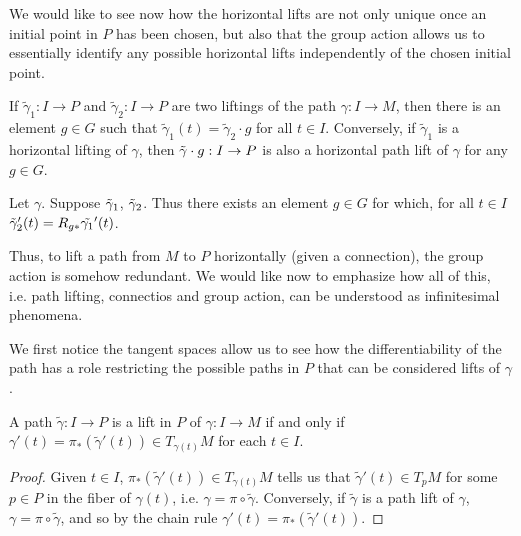 We would like to see now how the horizontal lifts are not only unique once an initial point in $P$ has been chosen, but also that the group action allows us to essentially identify any possible horizontal lifts independently of the chosen initial point.

\begin{theorem}\label{thm:pathRed}
If $\tilde{\gamma}_1: I \to P$ and $\tilde{\gamma}_2: I \to P$ are two liftings of the path $\gamma:I \to M$, then there is an element $g \in G$ such that $\tilde{\gamma}_1 (t) = \tilde{\gamma}_2 \cdot g$ for all $t \in I$. Conversely, if $\tilde{\gamma}_1$ is a horizontal lifting of $\gamma$, then $\Tilde{\gamma}\cdot g :I \to P$ is also a horizontal path lift of $\gamma$ for any $g\in G$.
\end{theorem}

\begin{corollary}\label{cor:tpRed}
Let $\gamma$. Suppose $\Tilde{\gamma}_1$, $\Tilde{\gamma}_2$. Thus there exists an element $g \in G$ for which, for all $t \in I$ $\Tilde{\gamma}_2'(t) = R_{g*}\Tilde{\gamma_1}'(t)$.
\end{corollary}

Thus, to lift a path from $M$ to $P$ horizontally (given a connection), the group action is somehow redundant. We would like now to emphasize how all of this, i.e. path lifting, connectios and group action, can be understood as infinitesimal phenomena. 

We first notice the tangent spaces allow us to see how the differentiability of the path has a role restricting the possible paths in $P$ that can be considered lifts of $\gamma$. %

\begin{proposition}
A path $\tilde{\gamma}:I \to P$ is a lift in $P$ of $\gamma:I \to M$ if and only if $\gamma'(t) = \pi_*(\tilde{\gamma}'(t)) \in T_{\gamma(t)}M$ for each $t \in I$.
\end{proposition}

\begin{proof}
Given $t \in I$, $\pi_*(\tilde{\gamma}'(t)) \in T_{\gamma(t)}M$ tells us that $\tilde{\gamma}'(t) \in T_p M$ for some $p \in P$ in the fiber of $\gamma(t)$, i.e. $\gamma = \pi \circ \tilde{\gamma}$. Conversely, if $\tilde{\gamma}$ is a path lift of $\gamma$, $\gamma = \pi \circ \tilde{\gamma}$, and so by the chain rule $\gamma'(t) = \pi_*(\tilde{\gamma}'(t))$.
\end{proof}


